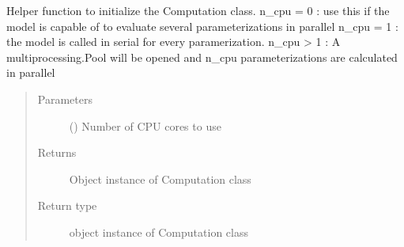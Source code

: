 \documentclass[letterpaper,10pt,english,openany,oneside]{sphinxmanual}
\begin{document}
\begin{fulllineitems}
\label{\detokenize{pygpc:pygpc.Computation.Computation}}
Helper function to initialize the Computation class.
n\_cpu = 0 : use this if the model is capable of to evaluate several parameterizations in parallel
n\_cpu = 1 : the model is called in serial for every paramerization.
n\_cpu \textgreater{} 1 : A multiprocessing.Pool will be opened and n\_cpu parameterizations are calculated in parallel
\begin{quote}\begin{description}
\item[{Parameters}] \leavevmode
{} () \textendash{} Number of CPU cores to use

\item[{Returns}] \leavevmode
{} \textendash{} Object instance of Computation class

\item[{Return type}] \leavevmode
object instance of Computation class

\end{description}\end{quote}

\end{fulllineitems}

\end{document}
